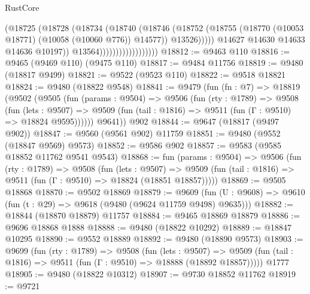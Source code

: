 \begin{lexlean}{RustCore}
\begin{coremodule}
                                          (@18725
                                            (@18728
                                              (@18734
                                                (@18740
                                                  (@18746
                                                    (@18752
                                                      (@18755
                                                        (@18770
                                                          (@10053 @18771)
                                                          (@10058 (@10060 @776))
                                                          @14577))
                                                      @13526)))))
                                            @14627
                                            @14630
                                            @14633
                                            @14636
                                            @10197))
                                        @13564))))))))))))))))))
@18812 := @9463 @110
@18816 := @9465 (@9469 @110) (@9475 @110)
@18817 := @9484 @11756
@18819 := @9480 (@18817 @9499)
@18821 := @9522 (@9523 @110)
@18822 := @9518 @18821
@18824 := @9480 (@18822 @9548)
@18841 := @9479
    (fun (fn : @7) =>
    @18819
      (@9502
        (@9505
          (fun (params : @9504) =>
          @9506
            (fun (rty : @1789) =>
            @9508
              (fun (lets : @9507) =>
              @9509 (fun (tail : @1816) => @9511 (fun (Γ : @9510) => @18824 @9595))))))
        @9641))
    @902
@18844 := @9647 (@18817 (@9497 @902))
@18847 := @9560 (@9561 @902) @11759
@18851 := @9480 (@9552 (@18847 @9569) @9573)
@18852 := @9586 @902
@18857 := @9583 (@9585 @18852 @11762 @9541 @9543)
@18868 := fun (params : @9504) =>
  @9506
    (fun (rty : @1789) =>
    @9508
      (fun (lets : @9507) =>
      @9509 (fun (tail : @1816) => @9511 (fun (Γ : @9510) => @18824 (@18851 @18857)))))
@18869 := @9505 @18868
@18870 := @9502 @18869
@18879 := @9609
    (fun (U : @9608) => @9610 (fun (t : @29) => @9618 (@9480 (@9624 @11759 @9498) @9635)))
@18882 := @18844 (@18870 @18879) @11757
@18884 := @9465 @18869 @18879
@18886 := @9696 @18868 @1888
@18888 := @9480 (@18822 @10292)
@18889 := @18847 @10295
@18890 := @9552 @18889
@18892 := @9480 (@18890 @9573)
@18903 := @9699
    (fun (rty : @1789) =>
    @9508
      (fun (lets : @9507) =>
      @9509 (fun (tail : @1816) => @9511 (fun (Γ : @9510) => @18888 (@18892 @18857)))))
    @1777
@18905 := @9480 (@18822 @10312)
@18907 := @9730 @18852 @11762
@18919 := @9721

\end{coremodule}
\end{lexlean}
